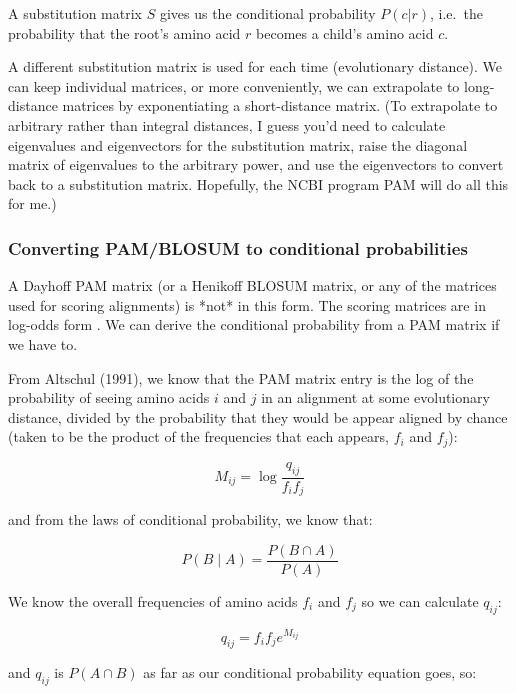 A substitution matrix $S$ gives us the conditional probability $P(c |
r)$, i.e.\ the probability that the root's amino acid $r$ becomes a
child's amino acid $c$.

A different substitution matrix is used for each time (evolutionary
distance). We can keep individual matrices, or more conveniently, we
can extrapolate to long-distance matrices by exponentiating a
short-distance matrix. (To extrapolate to arbitrary rather than
integral distances, I guess you'd need to calculate eigenvalues and
eigenvectors for the substitution matrix, raise the diagonal matrix of
eigenvalues to the arbitrary power, and use the eigenvectors to
convert back to a substitution matrix. Hopefully, the NCBI program PAM
will do all this for me.)

\subsubsection {Converting PAM/BLOSUM to conditional probabilities}

A Dayhoff PAM matrix (or a Henikoff BLOSUM matrix, or any of the
matrices used for scoring alignments) is *not* in this form.  The
scoring matrices are in log-odds form \cite{Altschul91}.  We can
derive the conditional probability from a PAM matrix if we have to.

From Altschul (1991), we know that the PAM matrix entry is the log of
the probability of seeing amino acids $i$ and $j$ in an alignment at
some evolutionary distance, divided by the probability that they would
be appear aligned by chance (taken to be the product of the
frequencies that each appears, $f_{i}$ and $f_{j}$):

\begin{equation}
 M_{ij} = \log \frac{q_{ij}}{f_{i} f_{j}}
\end{equation}

and from the laws of conditional probability, we know that:

\begin{equation}
 P(B \mid A) = \frac{P(B \cap A)}{P(A)}
\end{equation}

We know the overall frequencies of amino acids $f_{i}$ and $f_{j}$
so we can calculate $q_{ij}$:

\begin{equation}
 q_{ij} = f_{i} f_{j} e^{M_{ij}}
\end{equation}

and $q_{ij}$ is $P(A \cap B)$ as far as our conditional probability
equation goes, so:

